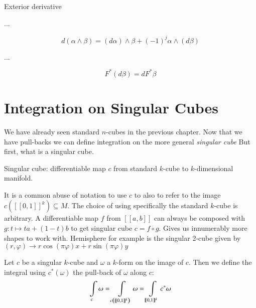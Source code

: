 \begin{definition}
Exterior derivative
\end{definition}

...

\begin{equation}
d(\alpha \wedge \beta) = (d \alpha) \wedge \beta + (-1)^j \alpha \wedge ( d \beta)
\end{equation}

...

\begin{equation}
F^* (d \beta ) = dF^* \beta
\end{equation}




%
%
\section{Integration on Singular Cubes}


We have already seen standard $n$-cubes in the previous chapter.
Now that we have pull-backs we can define integration on the more general \emph{singular cube}
But first, what is a singular cube.


\begin{definition}
	Singular cube: differentiable map $c$ from standard $k$-cube to $k$-dimensional manifold.
\end{definition}

It is a common abuse of notation to use $c$ to also to refer to the image $c( [\![ 0,1]\!]^k ) \subseteq M$.
The choice of using specifically the standard $k$-cube is arbitrary.
A differentiable map $f$ from $[\![a,b]\!]$ can always be composed with $g:t \mapsto ta +(1-t)b$ 
to get singular cube $c=f \circ g$.
Gives us innumerably more shapes to work with.
Hemisphere for example is the singular 2-cube given by $(r, \varphi) \to r \cos(\pi \varphi) x+ r \sin(\pi \varphi) y$


\begin{definition}
	Let $c$ be a singular $k$-cube and $\omega$ a $k$-form on the image of $c$.
	Then we define the integral using $c^*(\omega)$ the pull-back of $\omega$ along $c$:
	\begin{equation}
		\int\displaylimits_c \omega 
		= \int\displaylimits_{c \left( [\![0,1]\!]^k \right)} \omega
		= \int\displaylimits_{[\![0,1]\!]^k} c^* \omega
	\end{equation}
\end{definition}



